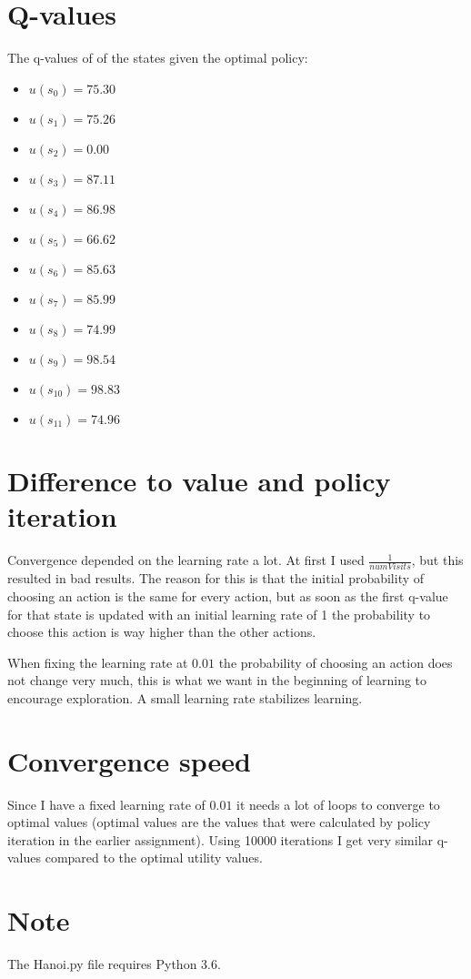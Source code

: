\documentclass[a4paper]{article}
\begin{document}
\section{Q-values}

The q-values of of the states given the optimal policy:
\begin{multicols}{2}
\begin{itemize}
\item $u(s_0) = 75.30 $
\item $u(s_1) = 75.26 $
\item $u(s_2) = 0.00 $
\item $u(s_3) = 87.11 $
\item $u(s_4) = 86.98 $
\item $u(s_5) = 66.62 $
\item $u(s_6) = 85.63 $
\item $u(s_7) = 85.99 $
\item $u(s_8) = 74.99 $
\item $u(s_9) = 98.54 $
\item $u(s_{10}) = 98.83 $
\item $u(s_{11}) = 74.96 $
\end{itemize}
\end{multicols}

\section{Difference to value and policy iteration}
Convergence depended on the learning rate a lot. At first I used $\frac{1}{numVisits}$, but this resulted in bad results. The reason for this is that the initial probability of choosing an action is the same for every action, but as soon as the first q-value for that state is updated with an initial learning rate of 1 the probability to choose this action is way higher than the other actions. 

When fixing the learning rate at $0.01$ the probability of choosing an action does not change very much, this is what we want in the beginning of learning to encourage exploration. A small learning rate stabilizes learning.

\section{Convergence speed}
Since I have a fixed learning rate of $0.01$ it needs a lot of loops to converge to optimal values (optimal values are the values that were calculated by policy iteration in the earlier assignment). Using 10000 iterations I get very similar q-values compared to the optimal utility values. 

\section{Note}
The Hanoi.py file requires Python 3.6.
\end{document}
